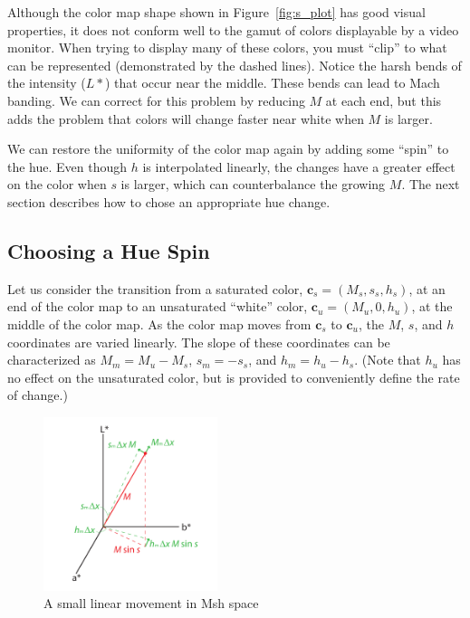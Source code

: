 \documentclass[review,journal]{vgtc}         %
\newcommand{\Msh}{Msh\xspace}
\newcommand*{\cvec}[1]{\mathbf{#1}}
\begin{document}
Although the color map shape shown in Figure~\ref{fig:s_plot} has good
visual properties, it does not conform well to the gamut of colors
displayable by a video monitor.  When trying to display many of these
colors, you must ``clip'' to what can be represented (demonstrated by the
dashed lines).  Notice the harsh bends of the intensity ($L*$) that occur
near the middle.  These bends can lead to Mach banding.  We can correct for
this problem by reducing $M$ at each end, but this adds the problem that
colors will change faster near white when $M$ is larger.

We can restore the uniformity of the color map again by adding some
``spin'' to the hue.  Even though $h$ is interpolated linearly, the changes
have a greater effect on the color when $s$ is larger, which can
counterbalance the growing $M$.  The next section describes how to chose an
appropriate hue change.

\subsection{Choosing a Hue Spin}
\label{sec:ChoosingAHueSpin}

Let us consider the transition from a saturated color, $\cvec{c}_s=(M_s,
s_s, h_s)$, at an end of the color map to an unsaturated ``white'' color,
$\cvec{c}_u=(M_u, 0, h_u)$, at the middle of the color map.  As the
color map moves from $\cvec{c}_s$ to $\cvec{c}_u$, the $M$, $s$, and $h$
coordinates are varied linearly.  The slope of these coordinates can be
characterized as $M_m = M_u - M_s$, $s_m = -s_s$, and $h_m = h_u - h_s$.
(Note that $h_u$ has no effect on the unsaturated color, but is provided to
conveniently define the rate of change.)

\begin{figure}
  \centering
  \includegraphics[height=2in]{images/MshDeltaMovements}
  \caption{A small linear movement in \Msh space}
  \label{sec:LinearMshMovement}
\end{figure}
\end{document}
